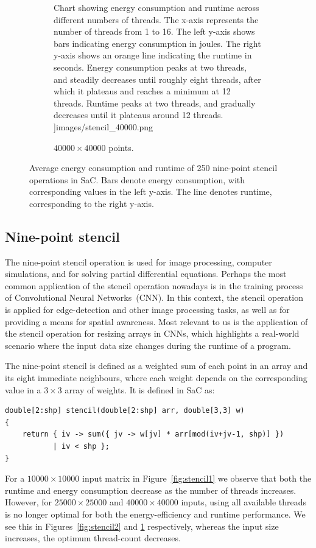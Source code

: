 \begin{figure}[!ht]
\begin{subfigure}{0.33\linewidth}
{            Chart showing energy consumption and runtime across different numbers of threads. The
            x-axis represents the number of threads from 1 to 16. The left y-axis shows bars
            indicating energy consumption in joules. The right y-axis shows an orange line
            indicating the runtime in seconds. Energy consumption peaks at two threads, and steadily
            decreases until roughly eight threads, after which it plateaus and reaches a minimum at
            12 threads. Runtime peaks at two threads, and gradually decreases until it plateaus
            around 12 threads.
        }]{images/stencil_40000.png}
        \caption{$40000 \times 40000$ points.}
        \label{fig:stencil3}
    \end{subfigure}%
    \caption{Average energy consumption and runtime of 250 nine-point stencil operations in SaC.
    Bars denote energy consumption, with corresponding values in the left y-axis.
    The line denotes runtime, corresponding to the right y-axis.}
    \label{fig:stencil}
\end{figure}

\subsection{Nine-point stencil}\label{sec:stencil}
The nine-point stencil operation is used for image processing, computer simulations, and for solving
partial differential equations. Perhaps the most common application of the stencil operation
nowadays is in the training process of Convolutional Neural Networks~(CNN). In this context, the
stencil operation is applied for edge-detection and other image processing tasks, as well as for
providing a means for spatial awareness. Most relevant to us is the application of the stencil
operation for resizing arrays in CNNs, which highlights a real-world scenario where the input data
size changes during the runtime of a program.

The nine-point stencil is defined as a weighted sum of each point in an array and its eight
immediate neighbours, where each weight depends on the corresponding value in a $3 \times 3$ array
of weights. It is defined in SaC as:
\begin{verbatim}
double[2:shp] stencil(double[2:shp] arr, double[3,3] w)
{
    return { iv -> sum({ jv -> w[jv] * arr[mod(iv+jv-1, shp)] })
           | iv < shp };
}
\end{verbatim}

For a $10000 \times 10000$ input matrix in Figure~\ref{fig:stencil1} we observe that both the
runtime and energy consumption decrease as the number of threads increases. However, for $25000
\times 25000$ and $40000 \times 40000$ inputs, using all available threads is no longer optimal for
both the energy-efficiency and runtime performance. We see this in Figures~\ref{fig:stencil2} and
\ref{fig:stencil3} respectively, whereas the input size increases, the optimum thread-count
decreases.

